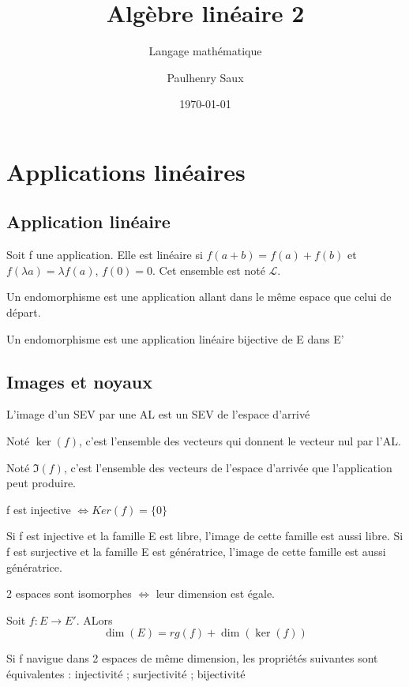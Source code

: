 \documentclass[french]{yLectureNote}
\title{Algèbre linéaire 2}
\subtitle{Langage mathématique}
\author{Paulhenry Saux}
\date{\today}
\begin{document}
\setcounter{chapter}{1}
\chapter{Applications linéaires}
\section{Application linéaire}
\begin{definition}
Soit f une application. Elle est linéaire si \(f(a+b) = f(a)+f(b)\) et \(f(\lambda a) = \lambda f (a)\), \(f(0) = 0\). Cet ensemble est noté \(\mathcal{L}\).
\end{definition}
\begin{definition}[Endomorphisme]
Un endomorphisme est une application allant dans le m\^eme espace que celui de départ.
\end{definition}
\begin{definition}[Isomorphisme]
Un endomorphisme est une application linéaire bijective de E dans E'
\end{definition}
\section{Images et noyaux}
\begin{proposition}
L'image d'un SEV par une AL est un SEV de l'espace d'arrivé
\end{proposition}
\begin{definition}[Noyau]
Noté \(\ker(f)\), c'est l'ensemble des vecteurs qui donnent le vecteur nul par l'AL.
\end{definition}
\begin{definition}[Image]
Noté \(\Im(f)\), c'est l'ensemble des vecteurs de l'espace d'arrivée que l'application peut produire.
\end{definition}
\begin{proposition}
f est injective \(\iff Ker(f) = \{0\}\)
\end{proposition}
\begin{proposition}[Famille et AL]
Si f est injective et la famille E est libre, l'image de cette famille est aussi libre. Si f est surjective et la famille E est génératrice, l'image de cette famille est aussi génératrice.
\end{proposition}
\begin{definition}
2 espaces sont isomorphes \(\iff\) leur dimension est égale.
\end{definition}
\begin{theorem}
Soit \(f:E\to E'\). ALors \[\dim(E) = rg(f)+\dim(\ker(f))\]
\end{theorem}
\begin{theorem}
Si f navigue dans 2 espaces de m\^eme dimension, les propriétés suivantes sont équivalentes : injectivité ; surjectivité ; bijectivité
\end{theorem}
\end{document}
